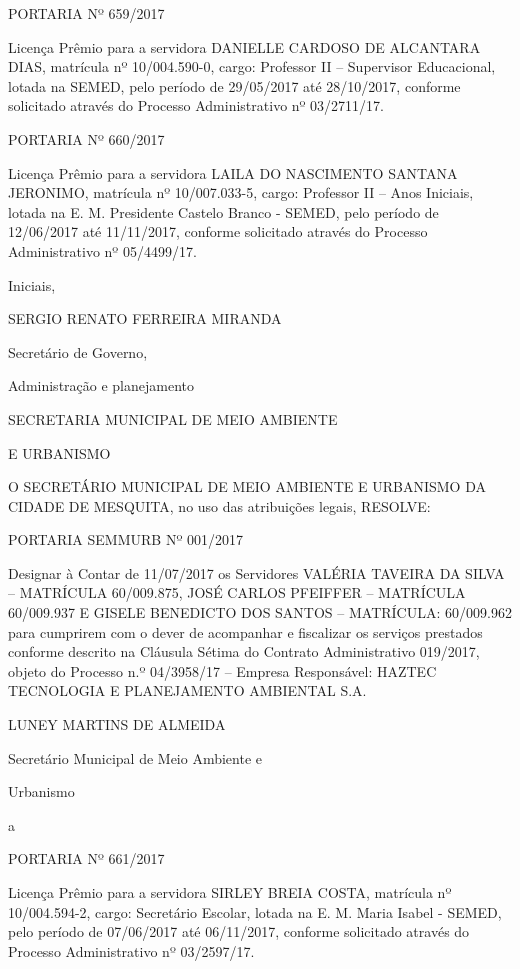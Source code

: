 \documentclass{doliberto}
\begin{document}
PORTARIA Nº 659/2017 
 
Licença Prêmio  para a servidora  DANIELLE CARDOSO  DE 
ALCANTARA  DIAS,  matrícula  nº  10/004.590-0,  cargo: 
Professor  II  –  Supervisor  Educacional,  lotada  na  SEMED, 
pelo  período  de  29/05/2017  até  28/10/2017,  conforme 
solicitado  através  do  Processo  Administrativo  nº 
03/2711/17. 
 
PORTARIA Nº 660/2017 
 
Licença  Prêmio  para  a  servidora  LAILA  DO  NASCIMENTO 
SANTANA  JERONIMO,  matrícula  nº  10/007.033-5,  cargo: 
Professor  II  –  Anos  Iniciais,  lotada  na  E.  M.  Presidente 
Castelo  Branco  -  SEMED,  pelo  período  de  12/06/2017  até 
11/11/2017,  conforme  solicitado  através  do  Processo 
Administrativo nº 05/4499/17. 

Iniciais, 
 
SERGIO RENATO FERREIRA MIRANDA 

Secretário de Governo, 

 Administração e planejamento 

SECRETARIA MUNICIPAL DE MEIO AMBIENTE 

E URBANISMO 

 
O SECRETÁRIO MUNICIPAL DE MEIO 
AMBIENTE E URBANISMO DA CIDADE DE 
MESQUITA, no uso das atribuições legais, 
RESOLVE: 
 
PORTARIA SEMMURB Nº 001/2017 
 
Designar  à  Contar  de  11/07/2017  os  Servidores 
VALÉRIA TAVEIRA DA SILVA – MATRÍCULA 60/009.875, 
JOSÉ  CARLOS  PFEIFFER  –  MATRÍCULA  60/009.937  E 
GISELE  BENEDICTO  DOS  SANTOS  –  MATRÍCULA: 
60/009.962  para cumprirem com o dever de acompanhar 
e  fiscalizar  os  serviços  prestados  conforme  descrito  na 
Cláusula Sétima do Contrato Administrativo 019/2017, 
objeto  do  Processo  n.º  04/3958/17  –  Empresa 
Responsável:  HAZTEC  TECNOLOGIA  E  PLANEJAMENTO 
AMBIENTAL S.A. 

 

LUNEY MARTINS DE ALMEIDA 

Secretário Municipal de Meio Ambiente e 

Urbanismo 

 

a 

 
PORTARIA Nº 661/2017 
 
Licença  Prêmio  para  a  servidora  SIRLEY  BREIA  COSTA, 
matrícula  nº  10/004.594-2,  cargo:  Secretário  Escolar, 
lotada  na  E.  M.  Maria  Isabel  -  SEMED,  pelo  período  de 
07/06/2017  até  06/11/2017,  conforme  solicitado  através 
do Processo Administrativo nº 03/2597/17. 
 
\end{document}
